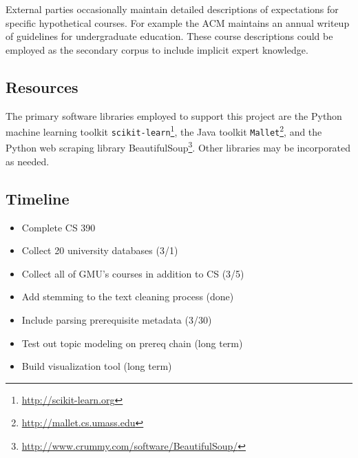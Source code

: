 External parties occasionally maintain detailed descriptions of
expectations for specific hypothetical courses. For example the ACM
maintains an annual writeup of guidelines for undergraduate education.
\cite{CS2013} These course descriptions could be employed as the secondary
corpus to include implicit expert knowledge.


\subsection{Resources}

The primary software libraries employed to support this project are the
Python machine learning toolkit
\texttt{scikit-learn}\footnote{\url{http://scikit-learn.org}}, the Java
toolkit \texttt{Mallet}\footnote{\url{http://mallet.cs.umass.edu}}, and the
Python web scraping library
BeautifulSoup\footnote{\url{http://www.crummy.com/software/BeautifulSoup/}}.
Other libraries may be incorporated as needed.


\subsection{Timeline}

\begin{itemize}
  \item {\color{green}Complete CS 390}
  \item {\color{yellow}Collect 20 university databases (3/1)}
  \item Collect all of GMU's courses in addition to CS (3/5)
  \item {\color{green}Add stemming to the text cleaning process (done)}
  \item Include parsing prerequisite metadata (3/30)
  \item Test out topic modeling on prereq chain (long term)
  \item Build visualization tool (long term)
\end{itemize}

